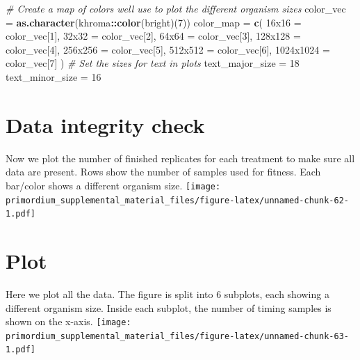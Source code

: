 \documentclass[
]{book}
\newenvironment{Shaded}{\begin{snugshade}}{\end{snugshade}}
\newcommand{\CommentTok}[1]{\textcolor[rgb]{0.56,0.35,0.01}{\textit{#1}}}
\newcommand{\DecValTok}[1]{\textcolor[rgb]{0.00,0.00,0.81}{#1}}
\newcommand{\KeywordTok}[1]{\textcolor[rgb]{0.13,0.29,0.53}{\textbf{#1}}}
\newcommand{\NormalTok}[1]{#1}
\newcommand{\OperatorTok}[1]{\textcolor[rgb]{0.81,0.36,0.00}{\textbf{#1}}}
\newcommand{\StringTok}[1]{\textcolor[rgb]{0.31,0.60,0.02}{#1}}
\begin{document}
\begin{Shaded}
\begin{Highlighting}[]
\CommentTok{\# Create a map of colors we\textquotesingle{}ll use to plot the different organism sizes}
\NormalTok{color\_vec =}\StringTok{ }\KeywordTok{as.character}\NormalTok{(khroma}\OperatorTok{::}\KeywordTok{color}\NormalTok{(}\StringTok{\textquotesingle{}bright\textquotesingle{}}\NormalTok{)(}\DecValTok{7}\NormalTok{))}
\NormalTok{color\_map =}\StringTok{ }\KeywordTok{c}\NormalTok{(}
  \StringTok{\textquotesingle{}16x16\textquotesingle{}}\NormalTok{ =}\StringTok{     }\NormalTok{color\_vec[}\DecValTok{1}\NormalTok{],}
  \StringTok{\textquotesingle{}32x32\textquotesingle{}}\NormalTok{ =}\StringTok{     }\NormalTok{color\_vec[}\DecValTok{2}\NormalTok{],}
  \StringTok{\textquotesingle{}64x64\textquotesingle{}}\NormalTok{ =}\StringTok{     }\NormalTok{color\_vec[}\DecValTok{3}\NormalTok{],}
  \StringTok{\textquotesingle{}128x128\textquotesingle{}}\NormalTok{ =}\StringTok{   }\NormalTok{color\_vec[}\DecValTok{4}\NormalTok{],}
  \StringTok{\textquotesingle{}256x256\textquotesingle{}}\NormalTok{ =}\StringTok{   }\NormalTok{color\_vec[}\DecValTok{5}\NormalTok{],}
  \StringTok{\textquotesingle{}512x512\textquotesingle{}}\NormalTok{ =}\StringTok{   }\NormalTok{color\_vec[}\DecValTok{6}\NormalTok{],}
  \StringTok{\textquotesingle{}1024x1024\textquotesingle{}}\NormalTok{ =}\StringTok{ }\NormalTok{color\_vec[}\DecValTok{7}\NormalTok{]}
\NormalTok{)}
\CommentTok{\# Set the sizes for text in plots}
\NormalTok{text\_major\_size =}\StringTok{ }\DecValTok{18}
\NormalTok{text\_minor\_size =}\StringTok{ }\DecValTok{16} 
\end{Highlighting}
\end{Shaded}

\hypertarget{data-integrity-check-3}{%
\section{Data integrity check}\label{data-integrity-check-3}}

Now we plot the number of finished replicates for each treatment to make sure all data are present.
Rows show the number of samples used for fitness.
Each bar/color shows a different organism size.
\texttt{[image: primordium\_supplemental\_material\_files/figure-latex/unnamed-chunk-62-1.pdf]}

\hypertarget{plot}{%
\section{Plot}\label{plot}}

Here we plot all the data.
The figure is split into 6 subplots, each showing a different organism size.
Inside each subplot, the number of timing samples is shown on the x-axis.
\texttt{[image: primordium\_supplemental\_material\_files/figure-latex/unnamed-chunk-63-1.pdf]}
\end{document}
